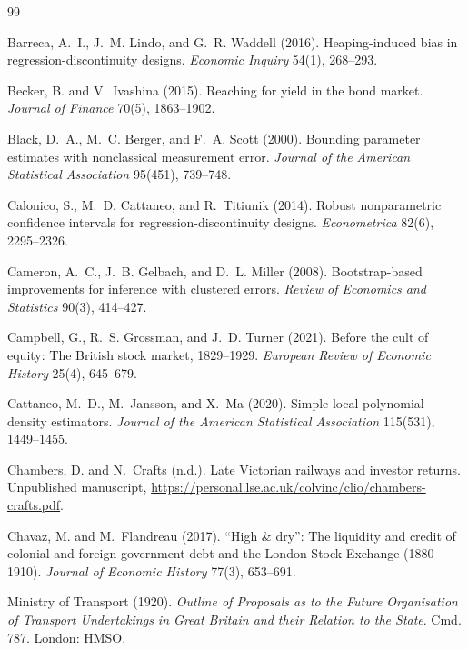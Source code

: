 \documentclass[11pt]{article}
\begin{document}
\newpage
{}
\begin{thebibliography}{99}\small

Barreca, A.~I., J.~M. Lindo, and G.~R. Waddell (2016). Heaping-induced bias in regression-discontinuity designs. \textit{Economic Inquiry} 54(1), 268--293.

Becker, B. and V.~Ivashina (2015). Reaching for yield in the bond market. \textit{Journal of Finance} 70(5), 1863--1902.

Black, D.~A., M.~C. Berger, and F.~A. Scott (2000). Bounding parameter estimates with nonclassical measurement error. \textit{Journal of the American Statistical Association} 95(451), 739--748.

Calonico, S., M.~D. Cattaneo, and R.~Titiunik (2014). Robust nonparametric confidence intervals for regression-discontinuity designs. \textit{Econometrica} 82(6), 2295--2326.

Cameron, A.~C., J.~B. Gelbach, and D.~L. Miller (2008). Bootstrap-based improvements for inference with clustered errors. \textit{Review of Economics and Statistics} 90(3), 414--427.

Campbell, G., R.~S. Grossman, and J.~D. Turner (2021). Before the cult of equity: The British stock market, 1829--1929. \textit{European Review of Economic History} 25(4), 645--679.

Cattaneo, M.~D., M.~Jansson, and X.~Ma (2020). Simple local polynomial density estimators. \textit{Journal of the American Statistical Association} 115(531), 1449--1455.

Chambers, D. and N.~Crafts (n.d.). Late Victorian railways and investor returns. Unpublished manuscript, \url{https://personal.lse.ac.uk/colvinc/clio/chambers-crafts.pdf}.

Chavaz, M. and M.~Flandreau (2017). ``High \& dry'': The liquidity and credit of colonial and foreign government debt and the London Stock Exchange (1880--1910). \textit{Journal of Economic History} 77(3), 653--691.

Ministry of Transport (1920). \textit{Outline of Proposals as to the Future Organisation of Transport Undertakings in Great Britain and their Relation to the State}. Cmd. 787. London: HMSO.


\end{thebibliography}
\end{document}
